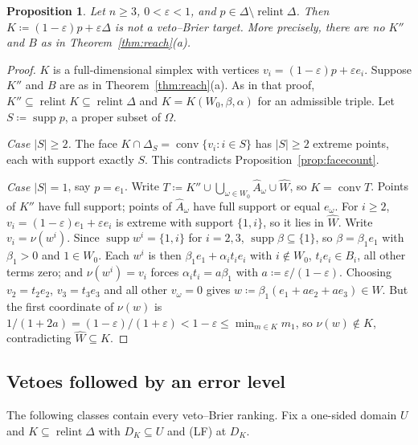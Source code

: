 \documentclass[11pt]{article}
\DeclareMathOperator{\conv}{conv}
\DeclareMathOperator{\relint}{relint}
\DeclareMathOperator{\supp}{supp}
\theoremstyle{plain}
\newtheorem{proposition}[theorem]{Proposition}
\theoremstyle{definition}
\theoremstyle{remark}
\begin{document}
\begin{proposition}\label{prop:contamzero}
Let $n\ge3$, $0<\varepsilon<1$, and $p\in\Delta\setminus\relint\Delta$. Then
$K\coloneqq(1-\varepsilon)p+\varepsilon\Delta$ is not a veto--Brier target. More precisely,
there are no $K''$ and $B$ as in Theorem~\ref{thm:reach}(a).
\end{proposition}

\begin{proof}
$K$ is a full-dimensional simplex with vertices $v_i=(1-\varepsilon)p+\varepsilon e_i$.
Suppose $K''$ and $B$ are as in Theorem~\ref{thm:reach}(a). As in that proof, $K''\subseteq
\relint K\subseteq\relint\Delta$ and $K=K(W_0,\beta,\alpha)$ for an admissible triple. Let
$S\coloneqq\supp p$, a proper subset of $\Omega$.

\emph{Case $|S|\ge2$.} The face $K\cap\Delta_S=\conv\{v_i:i\in S\}$ has $|S|\ge2$ extreme
points, each with support exactly $S$. This contradicts Proposition~\ref{prop:facecount}.

\emph{Case $|S|=1$}, say $p=e_1$. Write $T\coloneqq K''\cup\bigcup_{\omega\in W_0}\hat
A_\omega\cup\hat W$, so $K=\conv T$. Points of $K''$ have full support; points of $\hat
A_\omega$ have full support or equal $e_\omega$. For $i\ge2$, $v_i=(1-\varepsilon)e_1+
\varepsilon e_i$ is extreme with support $\{1,i\}$, so it lies in $\hat W$. Write
$v_i=\nu(w^i)$. Since $\supp w^i=\{1,i\}$ for $i=2,3$, $\supp\beta\subseteq\{1\}$, so
$\beta=\beta_1e_1$ with $\beta_1>0$ and $1\in W_0$. Each $w^i$ is then $\beta_1e_1+\alpha_i
t_ie_i$ with $i\notin W_0$, $t_ie_i\in B_i$, all other terms zero; and $\nu(w^i)=v_i$
forces $\alpha_it_i=a\beta_1$ with $a\coloneqq\varepsilon/(1-\varepsilon)$. Choosing
$v_2=t_2e_2$, $v_3=t_3e_3$ and all other $v_\omega=0$ gives $w\coloneqq\beta_1(e_1+ae_2+
ae_3)\in W$. But the first coordinate of $\nu(w)$ is $1/(1+2a)=(1-\varepsilon)/
(1+\varepsilon)<1-\varepsilon\le\min_{m\in K}m_1$, so $\nu(w)\notin K$, contradicting
$\hat W\subseteq K$.
\end{proof}

\subsection{Vetoes followed by an error level}\label{sec:excl-veto}

The following classes contain every veto--Brier ranking. Fix a one-sided domain $U$ and
$K\subseteq\relint\Delta$ with $D_K\subseteq U$ and (LF) at $D_K$.
\end{document}
